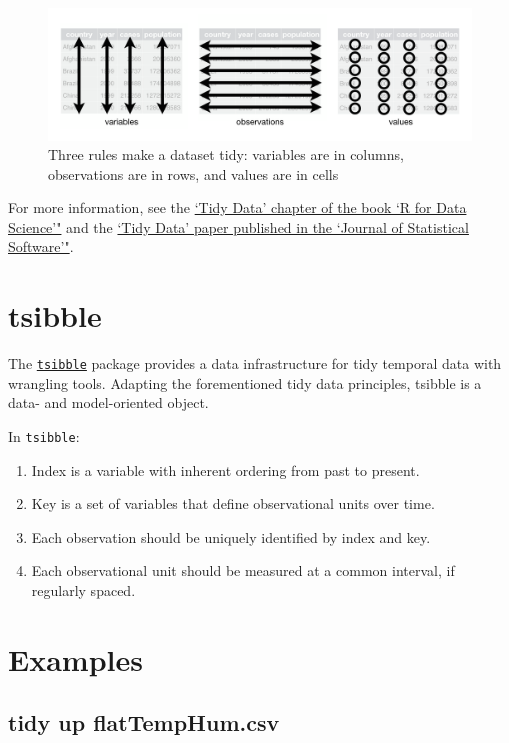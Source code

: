 \documentclass[
  a4paperpaper,
]{book}
\providecommand{\tightlist}{%
  \setlength{\itemsep}{0pt}\setlength{\parskip}{0pt}}
\begin{document}
\begin{figure}
\includegraphics[width=0.7\linewidth]{images/tidyData} \caption{Three rules make a dataset tidy: variables are in columns, observations are in rows, and values are in cells}\label{fig:unnamed-chunk-9}
\end{figure}

For more information, see the \href{https://r4ds.had.co.nz/tidy-data.html}{`Tidy Data' chapter of the book `R for Data Science'"} and the \href{http://www.jstatsoft.org/v59/i10/paper}{`Tidy Data' paper published in the `Journal of Statistical Software'"}.

\hypertarget{tsibble}{%
\section{tsibble}\label{tsibble}}

The \href{https://tsibble.tidyverts.org/}{\texttt{tsibble}} package provides a data infrastructure for tidy temporal data with wrangling tools. Adapting the forementioned tidy data principles, tsibble is a data- and model-oriented object.

In \texttt{tsibble}:

\begin{enumerate}
\def\labelenumi{\arabic{enumi}.}
\tightlist
\item
  Index is a variable with inherent ordering from past to present.
\item
  Key is a set of variables that define observational units over time.
\item
  Each observation should be uniquely identified by index and key.
\item
  Each observational unit should be measured at a common interval, if regularly spaced.
\end{enumerate}

\hypertarget{examples}{%
\section{Examples}\label{examples}}

\hypertarget{tidy-up-flattemphum.csv}{%
\subsection{tidy up flatTempHum.csv}\label{tidy-up-flattemphum.csv}}
\end{document}
